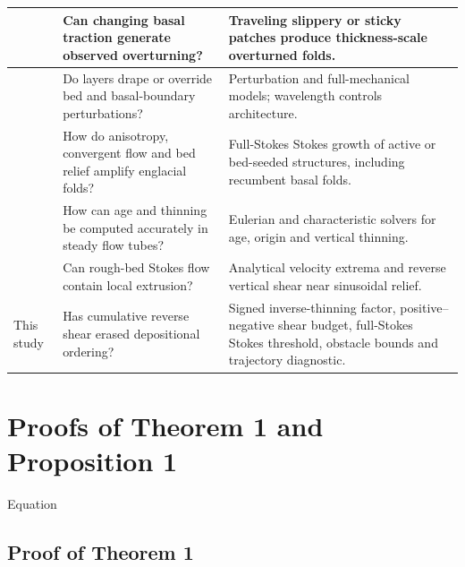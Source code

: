 \documentclass[review]{igs}
\providecommand{\DIFadd}[1]{{\protect\color{blue} \sf #1}} %
\providecommand{\DIFdel}[1]{{\protect\color{red} \scriptsize #1}} %
\providecommand{\DIFaddbegin}{} %
\providecommand{\DIFaddend}{} %
\providecommand{\DIFdelbegin}{} %
\providecommand{\DIFdelend}{} %
\newcommand{\DIFscaledelfig}{0.5}
\newlength{\DIFdelgraphicswidth} %
\newlength{\DIFdelgraphicsheight} %
\newcommand{\DIFaddincludegraphics}[2][]{{\color{blue}\fbox{\DIFOincludegraphics[#1]{#2}}}} %
\newcommand{\DIFdelincludegraphics}[2][]{%
\sbox{\DIFdelgraphicsbox}{\DIFOincludegraphics[#1]{#2}}%
\settoboxwidth{\DIFdelgraphicswidth}{\DIFdelgraphicsbox} %
\settoboxtotalheight{\DIFdelgraphicsheight}{\DIFdelgraphicsbox} %
\scalebox{\DIFscaledelfig}{%
\parbox[b]{\DIFdelgraphicswidth}{\usebox{\DIFdelgraphicsbox}\\[-\baselineskip] \rule{\DIFdelgraphicswidth}{0em}}\llap{\resizebox{\DIFdelgraphicswidth}{\DIFdelgraphicsheight}{%
\setlength{\unitlength}{\DIFdelgraphicswidth}%
\begin{picture}(1,1)%
\thicklines\linethickness{2pt} %
{\color[rgb]{1,0,0}\put(0,0){\framebox(1,1){}}}%
{\color[rgb]{1,0,0}\put(0,0){\line( 1,1){1}}}%
{\color[rgb]{1,0,0}\put(0,1){\line(1,-1){1}}}%
\end{picture}%
}\hspace*{3pt}}} %
} %
\DeclareRobustCommand{\DIFaddbegin}{\DIFOaddbegin \let\includegraphics\DIFaddincludegraphics} %
\DeclareRobustCommand{\DIFaddend}{\DIFOaddend \let\includegraphics\DIFOincludegraphics} %
\DeclareRobustCommand{\DIFdelbegin}{\DIFOdelbegin \let\includegraphics\DIFdelincludegraphics} %
\DeclareRobustCommand{\DIFdelend}{\DIFOaddend \let\includegraphics\DIFOincludegraphics} %
\begin{document}
\begin{longtable}{@{}p{}p{}p{}@{}}
\midrule
\citet{Wolovick2014,WolovickCreyts2016} & Can changing basal traction generate observed overturning? & Traveling slippery or sticky patches produce thickness-scale overturned folds. \\
\midrule
\citet{Hindmarsh2006} & Do layers drape or override bed and basal-boundary perturbations? & Perturbation and full-mechanical models; wavelength controls architecture. \\
\midrule
\citet{Zhang2024} & How do anisotropy, convergent flow and bed relief amplify englacial folds? & \DIFdelbegin \DIFdel{Full-Stokes }\DIFdelend \DIFaddbegin \DIFadd{Stokes }\DIFaddend growth of active or bed-seeded structures, including recumbent basal folds. \\
\midrule
\citet{HindmarshLeysingerVieliParrenin2009,ParreninChungMartin2025} & How can age and thinning be computed accurately in steady flow tubes? & Eulerian and characteristic solvers for age, origin and vertical thinning. \\
\midrule
\citet{Gudmundsson1997linear} & Can rough-bed Stokes flow contain local extrusion? & Analytical velocity extrema and reverse vertical shear near sinusoidal relief. \\
\midrule
This study & Has cumulative reverse shear erased depositional ordering? & Signed inverse-thinning factor, positive--negative shear budget, \DIFdelbegin \DIFdel{full-Stokes }\DIFdelend \DIFaddbegin \DIFadd{Stokes }\DIFaddend threshold, obstacle bounds and trajectory diagnostic. \\
\end{longtable}
\endgroup

\DIFdelbegin %
\DIFdelend \DIFaddbegin \section{Proofs of Theorem 1 and Proposition 1}
\label{app:proofs}
\DIFaddend 

\DIFdelbegin \DIFdel{Equation~}\DIFdelend \DIFaddbegin \subsection{Proof of Theorem 1}
\end{document}
